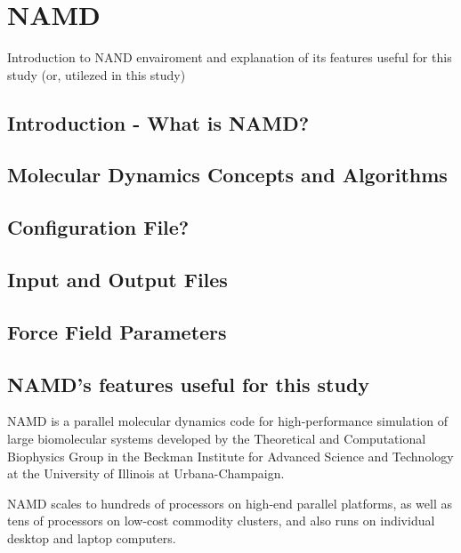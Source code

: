 \section{NAMD}
Introduction to NAND envairoment and explanation of its features useful for this study (or, utilezed in this study)

\subsection{Introduction - What is NAMD?}

\subsection{Molecular Dynamics Concepts and Algorithms}

\subsection{Configuration File?}

\subsection{Input and Output Files}

\subsection{Force Field Parameters}

\subsection{NAMD's features useful for this study}

NAMD is a parallel molecular dynamics code for high-performance simulation of large biomolecular systems developed by the Theoretical and Computational Biophysics Group in the Beckman Institute for Advanced Science and Technology at the University of Illinois at Urbana-Champaign. 


NAMD scales to hundreds of processors on high-end parallel platforms, as well as tens of processors on low-cost commodity clusters, and also runs on individual desktop and laptop computers. 

